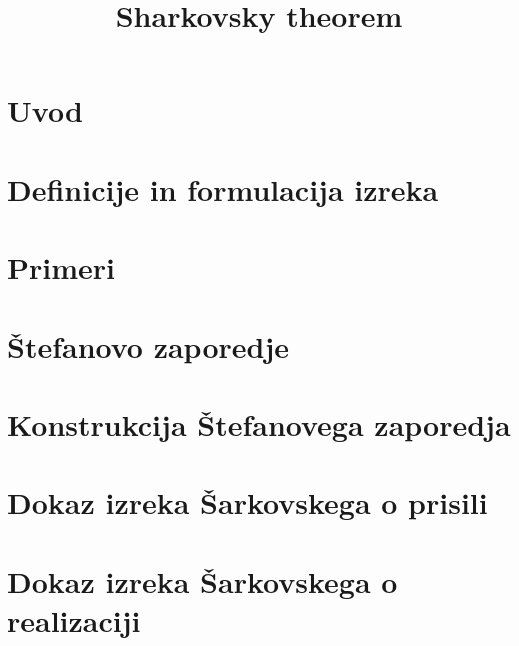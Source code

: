 \documentclass[ped, tisk]{fmfdelo}
\title{Sharkovsky theorem}
\begin{document}
\section{Uvod}


\section{Definicije in formulacija izreka}


\section{Primeri}\label{sec:primeri}


\section{Štefanovo zaporedje} \label{stefan_zap} 




\section{Konstrukcija Štefanovega zaporedja} \label{konssz}


\section{Dokaz izreka Šarkovskega o prisili}\label{sec:dokaz-izreka}


\section{Dokaz izreka Šarkovskega o realizaciji}\label{sec:realizacija}

\end{document}
